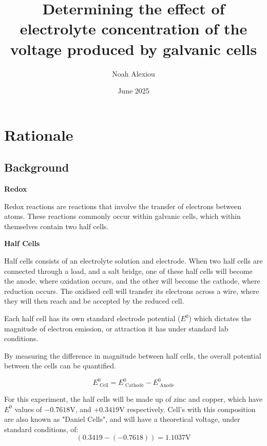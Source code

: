 \documentclass[11pt,a4paper]{article}
\begin{document}
	\nocite{*}
	
	\begin{titlepage}
		
		
		\title{Determining the effect of electrolyte concentration of the voltage produced by galvanic cells}
		
		\author{Noah Alexiou}
		
		
		\date{June 2025}
		
		\maketitle
		\centering
		
	\end{titlepage}
	\tableofcontents
	\newpage
	
	
	\section{Rationale}
	
	
	\subsection{Background}

	

	\textbf{Redox}
	
	Redox reactions are reactions that involve the transfer of electrons between atoms. These reactions commonly occur within galvanic cells, which within themselves contain two half cells. 
	

	\textbf{Half Cells}
	
	Half cells consists of an electrolyte solution and electrode. When two half cells are connected through a load, and a salt  bridge, one of these half cells will become the anode, where oxidation occurs, and the other will become the cathode, where reduction occurs. The oxidised cell will transfer its electrons across a wire, where they will then reach and be accepted by the reduced cell.
	
	Each half cell has its own standard electrode potential ($E^0$) which dictates the magnitude of electron emission, or attraction it has under standard lab conditions. 
	
	By measuring the difference in magnitude between half cells, the overall potential between the cells can be quantified. 
	
	$$
	E^0_{\textrm{ Cell}}=E^0_{\textrm{ Cathode}}-E^0_{\textrm{ Anode}}
	$$
	
	For this experiment, the half cells will be made up of zinc and copper, which have $E^0$ values of $-0.7618$V, and $+0.3419$V respectively. Cell's with this composition are also known as "Daniel Cells", and will have a theoretical voltage, under standard conditions, of: $$(0.3419-(-0.7618))=1.1037\textrm{V}$$
	
\end{document}
